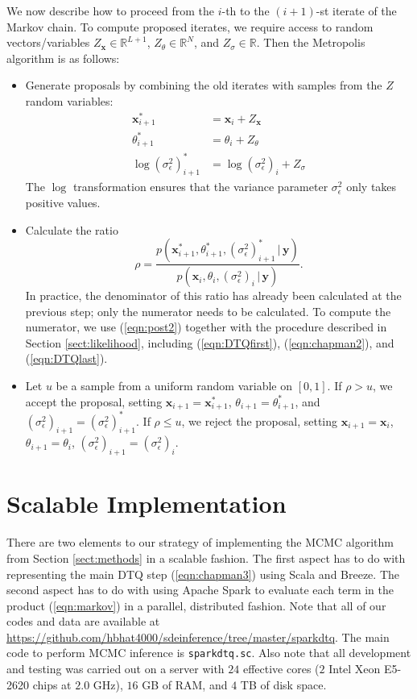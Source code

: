 \documentclass[wcp]{jmlr}
\begin{document}
We now describe how to proceed from the $i$-th to the
$(i+1)$-st iterate of the Markov chain.  To compute proposed iterates,
we require access to random vectors/variables $Z_\mathbf{x} \in \mathbb{R}^{L+1}$,
$Z_\theta \in \mathbb{R}^N$, and $Z_\sigma \in \mathbb{R}$.  Then the
Metropolis algorithm is as follows:
\begin{itemize}
\item Generate proposals by combining the old iterates with samples
  from the $Z$ random variables:
\begin{align*}
\mathbf{x}^\ast_{i+1} &= \mathbf{x}_i + Z_{\mathbf{x}} \\
\theta^\ast_{i+1} &= \theta_i + Z_\theta \\
\log (\sigma_\epsilon^2)^\ast_{i+1} &= \log (\sigma_\epsilon^2)_i + Z_\sigma
\end{align*}
The $\log$ transformation ensures that the variance parameter
$\sigma_\epsilon^2$ only takes positive values.
\item Calculate the ratio
\begin{equation}
\label{eqn:rho}
\rho = \frac{ p( \mathbf{x}^\ast_{i+1}, \theta^\ast_{i+1},
  (\sigma_\epsilon^2)^\ast_{i+1} \, | \, \mathbf{y} ) } { p(
  \mathbf{x}_{i}, \theta_{i}, (\sigma_\epsilon^2)_{i} \, | \,
  \mathbf{y} )  }.
\end{equation}
In practice, the denominator of this ratio has already been calculated at the
previous step; only the numerator needs to be calculated.  To
compute the numerator, we use (\ref{eqn:post2}) together with the
procedure described in Section \ref{sect:likelihood}, including
(\ref{eqn:DTQfirst}), (\ref{eqn:chapman2}), and (\ref{eqn:DTQlast}).
\item Let $u$ be a sample from a uniform random variable on $[0,1]$.
  If $\rho > u$, we accept the proposal, setting $\mathbf{x}_{i+1} =
  \mathbf{x}^\ast_{i+1}$, $\theta_{i+1} = \theta_{i+1}^\ast$, and
  $(\sigma_\epsilon^2)_{i+1} = (\sigma_\epsilon^2)^\ast_{i+1}$.  If
  $\rho \leq u$, we reject the proposal, setting $\mathbf{x}_{i+1} =
  \mathbf{x}_i$, $\theta_{i+1} = \theta_i$, $(\sigma_\epsilon^2)_{i+1} = (\sigma_\epsilon^2)_{i}$.
\end{itemize}

\section{Scalable Implementation}
\label{sect:scalableimplementation}

There are two elements to our strategy of implementing the MCMC
algorithm from Section \ref{sect:methods} in a scalable fashion.  The
first aspect has to do with representing the main DTQ step
(\ref{eqn:chapman3}) using Scala and Breeze.  The second aspect has to
do with using Apache Spark to evaluate each term in the product
(\ref{eqn:markov}) in a parallel, distributed fashion.  Note that all
of our codes and data are available at
\url{https://github.com/hbhat4000/sdeinference/tree/master/sparkdtq}.
The main code to perform MCMC inference is \texttt{sparkdtq.sc}.  Also
note that all development and testing was carried out on a server with
$24$ effective cores ($2$ Intel Xeon E5-2620 chips at $2.0$ GHz), $16$
GB of RAM, and $4$ TB of disk space.
\end{document}
